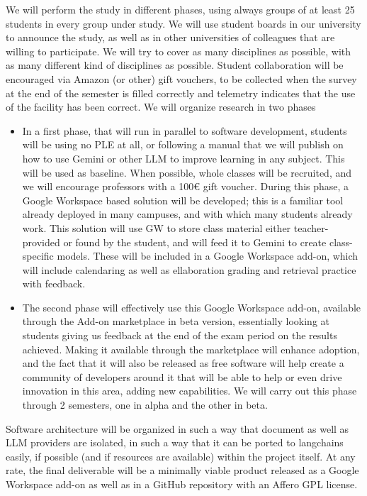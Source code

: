 \documentclass[a4paper,12pt]{article}
\begin{document}
We will perform the study in different phases, using always groups of at least
25 students in every group under study. We will use student boards in our
university to announce the study, as well as in other universities of colleagues
that are willing to participate. We will try to cover as many disciplines as
possible, with as many different kind of disciplines as possible. Student
collaboration will be encouraged via Amazon (or other) gift vouchers, to be
collected when the survey at the end of the semester is filled correctly and
telemetry indicates that the use of the facility has been correct. We will organize research in two phases\begin{itemize}
  \item In a first phase, that will run in parallel to software development,
    students will be using no PLE at all, or following a manual that we will
    publish on how to use Gemini or other LLM to improve learning in any
    subject. This will be used as baseline. When possible, whole classes will be
    recruited, and we will encourage professors with a 100€ gift voucher. During
    this phase, a Google Workspace based solution will be developed; this is a
    familiar tool already deployed in many campuses, and with which many
    students already work. This solution will use GW to store class material
    either teacher-provided or found by the student, and will feed it to Gemini
    to create class-specific models. These will be included in a Google
    Workspace add-on, which will include calendaring as well as ellaboration
    grading and retrieval practice with feedback.
  \item The second phase will effectively use this Google Workspace add-on,
    available through the Add-on marketplace in beta version, essentially
    looking at students giving us feedback at the end of the exam period on the
    results achieved. Making it available through the marketplace will enhance
    adoption, and the fact that it will also be released as free software will
    help create a community of developers around it that will be able to help or
    even drive innovation in this area, adding new capabilities. We will carry
    out this phase through 2 semesters, one in alpha and the other in beta.
  \end{itemize}

Software architecture will be organized in such a way that document as well as
LLM providers are isolated, in such a way that it can be ported to langchains
easily, if possible (and if resources are available) within the project
itself. At any rate, the final deliverable will be a minimally viable product
released as a Google Workspace add-on as well as in a GitHub repository with an
Affero GPL license.
\end{document}
